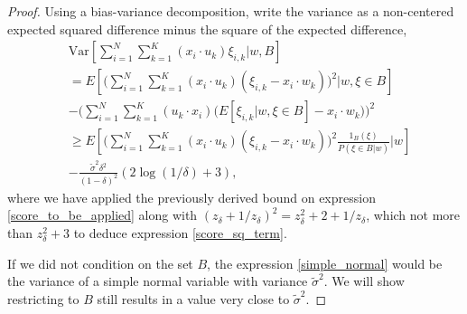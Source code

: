 \documentclass{article}
\numberwithin{equation}{section}
\theoremstyle{Lemma}
\theoremstyle{Corollary}
\theoremstyle{Theorem}
\theoremstyle{Remark}
\begin{document}
\begin{proof}
Using a bias-variance decomposition, write the variance as a non-centered expected squared difference minus the square of the expected difference,
\begin{align}
    &\text{Var}[\sum_{i=1}^{N}\sum_{k=1}^{K}(x_{i}\cdot u_{k})\xi_{i,k}|w,B]\\
    &=  E[\Big(\sum_{i=1}^{N}\sum_{k=1}^{K}(x_{i}\cdot u_{k})(\xi_{i,k}-x_{i}\cdot w_{k})\Big)^{2}|w,\xi \in B]\\
    &-\Big(\sum_{i=1}^{N}\sum_{k=1}^{K}(u_{k}\cdot x_{i})\Big(E[\xi_{i,k}|w,\xi \in B] - x_{i}\cdot w_{k} \Big)\Big)^{2}\label{score_to_be_applied}\\
    & \geq E[\Big(\sum_{i=1}^{N}\sum_{k=1}^{K}(x_{i}\cdot u_{k})(\xi_{i,k}-x_{i}\cdot w_{k})\Big)^{2}\frac{1_{B}(\xi)}{P(\xi \in B|w)}|w]\label{simple_normal}\\
    &-\frac{ \tilde{\sigma}^{2}\delta^2}{(1-\delta)^{2}}(2 \log (1/\delta) + 3),\label{score_sq_term}
\end{align}
where we have applied the previously derived bound on expression \eqref{score_to_be_applied} along with $(z_\delta +1/z_\delta)^2=z_\delta^2 +2+1/z_\delta$, which not more than $z_\delta^2+3$ to deduce expression \eqref{score_sq_term}. 

If we did not condition on the set $B$, the expression \eqref{simple_normal} would be the variance of a simple normal variable with variance $\tilde{\sigma}^{2}$. We will show restricting to $B$ still results in a value very close to $\tilde{\sigma}^{2}$.


\end{proof}
\end{document}

